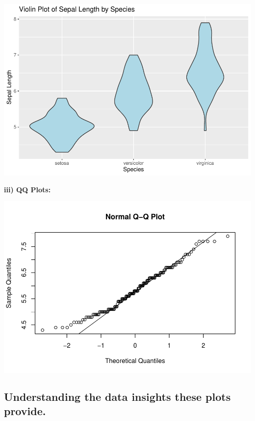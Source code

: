 \documentclass[
]{book}
\newenvironment{Shaded}{\begin{snugshade}}{\end{snugshade}}
\newcommand{\CommentTok}[1]{\textcolor[rgb]{0.56,0.35,0.01}{\textit{#1}}}
\newcommand{\FunctionTok}[1]{\textcolor[rgb]{0.13,0.29,0.53}{\textbf{#1}}}
\newcommand{\NormalTok}[1]{#1}
\newcommand{\SpecialCharTok}[1]{\textcolor[rgb]{0.81,0.36,0.00}{\textbf{#1}}}
\begin{document}
\includegraphics{_main_files/figure-latex/unnamed-chunk-68-1.pdf}

\textbf{iii) QQ Plots:}

\begin{Shaded}
\end{Shaded}

\includegraphics{_main_files/figure-latex/unnamed-chunk-69-1.pdf}

\subsection{Understanding the data insights these plots provide.}\label{understanding-the-data-insights-these-plots-provide.}
\end{document}

